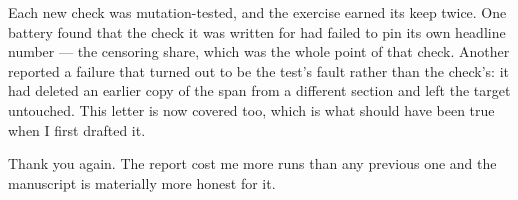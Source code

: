 \documentclass[11pt]{article}
\begin{document}
Each new check was mutation-tested, and the exercise earned its keep twice. One
battery found that the check it was written for had failed to pin its own headline
number --- the censoring share, which was the whole point of that check. Another
reported a failure that turned out to be the test's fault rather than the check's: it
had deleted an earlier copy of the span from a different section and left the target
untouched. This letter is now covered too, which is what should have been true when I
first drafted it.

\vspace{1em}
\noindent Thank you again. The report cost me more runs than any previous one and
the manuscript is materially more honest for it.
\end{document}
